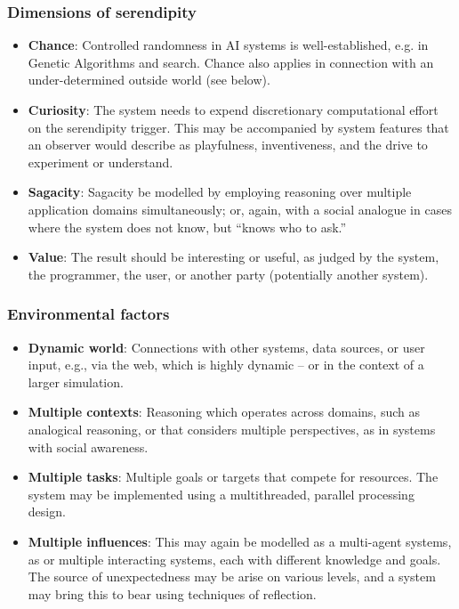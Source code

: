 \documentclass{llncs}
\begin{document}
\subsubsection*{Dimensions of serendipity}

\begin{itemize}
\item \textbf{Chance}: Controlled randomness in AI systems is
  well-established, e.g. in Genetic Algorithms and search.  Chance
  also applies in connection with an under-determined outside world
  (see below).
\item \textbf{Curiosity}: The system needs to expend discretionary
  computational effort on the serendipity trigger.  This may be
  accompanied by system features that an observer would describe as
  playfulness, inventiveness, and the drive to experiment or
  understand.
\item \textbf{Sagacity}: Sagacity be modelled by employing reasoning
  over multiple application domains simultaneously; or, again, with a
  social analogue in cases where the system does not know, but ``knows
  who to ask.''
\item \textbf{Value}: The result should be interesting or useful, as
  judged by the system, the programmer, the user, or another party
  (potentially another system).
\end{itemize}

\subsubsection*{Environmental factors}

\begin{itemize}
\item \textbf{Dynamic world}: Connections with other systems, data
  sources, or user input, e.g., via the web, which is highly dynamic --
  or in the context of a larger simulation.
\item \textbf{Multiple contexts}: Reasoning which operates across
  domains, such as analogical reasoning, or that considers multiple
  perspectives, as in systems with social awareness.
\item \textbf{Multiple tasks}: Multiple goals or targets that compete
  for resources.  The system may be implemented using a multithreaded,
  parallel processing design.
\item \textbf{Multiple influences}: This may again be modelled as a
  multi-agent systems, as or multiple interacting systems, each with
  different knowledge and goals.  The source of unexpectedness may be
  arise on various levels, and a system may bring this to bear using
  techniques of reflection.
\end{itemize}
\end{document}
